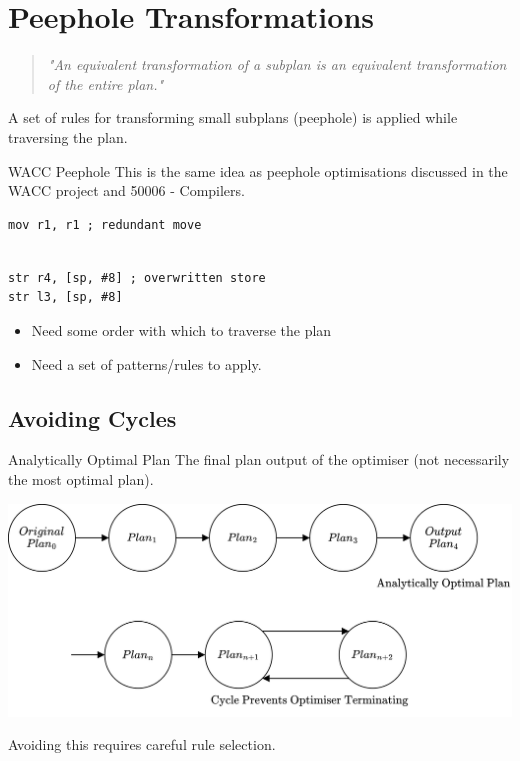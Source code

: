 \section{Peephole Transformations}
\begin{quote}
    \textit{"An equivalent transformation of a subplan is an equivalent transformation of the entire plan."}
\end{quote}
A set of rules for transforming small subplans (peephole) is applied while traversing the plan.

\begin{sidenotebox}{WACC Peephole}
    This is the same idea as peephole optimisations discussed in the WACC project and 50006 - Compilers.
    \begin{minipage}{.49\textwidth}
        \begin{verbatim}
mov r1, r1 ; redundant move
        
        \end{verbatim}
    \end{minipage} \hfill \begin{minipage}{.49\textwidth}
        \begin{verbatim}
str r4, [sp, #8] ; overwritten store 
str l3, [sp, #8]
        \end{verbatim}
    \end{minipage}
\end{sidenotebox}

\begin{itemize}
    \item Need some order with which to traverse the plan
    \item Need a set of patterns/rules to apply.
\end{itemize}

\subsection{Avoiding Cycles}
\begin{definitionbox}{Analytically Optimal Plan}
    The final plan output of the optimiser (not necessarily the most optimal plan). 
\end{definitionbox}
\begin{center}
    \includegraphics[width=.8\textwidth]{optimisation/images/optimiser_cycle.drawio.png}
\end{center}
Avoiding this requires careful rule selection.

